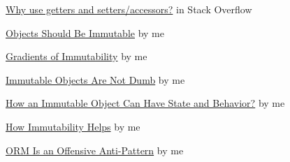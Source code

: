 \documentclass{article}
\begin{document}


\href{https://stackoverflow.com/questions/1568091/why-use-getters-and-setters-accessors}{Why use getters and setters/accessors?} in Stack Overflow

\href{https://www.yegor256.com/2014/06/09/objects-should-be-immutable.html}{Objects Should Be Immutable} by me

\href{https://www.yegor256.com/2016/09/07/gradients-of-immutability.html}{Gradients of Immutability} by me

\href{https://www.yegor256.com/2014/12/22/immutable-objects-not-dumb.html}{Immutable Objects Are Not Dumb} by me

\href{https://www.yegor256.com/2014/12/09/immutable-object-state-and-behavior.html}{How an Immutable Object Can Have State and Behavior?} by me

\href{https://www.yegor256.com/2014/11/07/how-immutability-helps.html}{How Immutability Helps} by me

\href{https://www.yegor256.com/2014/12/01/orm-offensive-anti-pattern.html}{ORM Is an Offensive Anti-Pattern} by me
\end{document}

